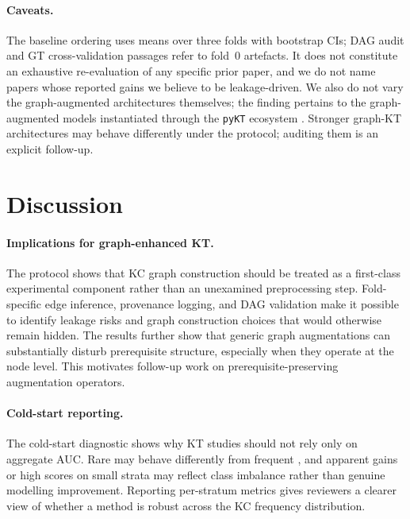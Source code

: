 \paragraph{Caveats.}
The baseline ordering uses means over three folds with bootstrap CIs;
DAG audit and GT cross-validation passages refer to fold~0 artefacts.
It does not constitute an exhaustive re-evaluation of any specific
prior paper, and we do not name papers whose reported gains we believe
to be leakage-driven. We also do not vary the graph-augmented architectures
themselves; the finding pertains to the graph-augmented models instantiated through the \texttt{pyKT} ecosystem
\cite{liu2022pykt}. Stronger graph-KT architectures may behave differently under
the protocol; auditing them is an explicit follow-up.
\section{Discussion}
\label{sec:disc}
\paragraph{Implications for graph-enhanced KT.}
The protocol shows that KC graph construction should be treated as a
first-class experimental component rather than an unexamined
preprocessing step. Fold-specific edge inference, provenance logging,
and DAG validation make it possible to identify leakage risks and graph
construction choices that would otherwise remain hidden. The \DDR{}
results further show that generic graph augmentations can substantially
disturb prerequisite structure, especially when they operate at the node
level. This motivates follow-up work on prerequisite-preserving
augmentation operators.
\paragraph{Cold-start reporting.}
The cold-start diagnostic shows why KT studies should not rely only on
aggregate AUC. Rare \KCs{} may behave differently from frequent
\KCs{}, and apparent gains or high scores on small strata may reflect
class imbalance rather than genuine modelling improvement. Reporting
per-stratum metrics gives reviewers a clearer view of whether a method
is robust across the KC frequency distribution.
